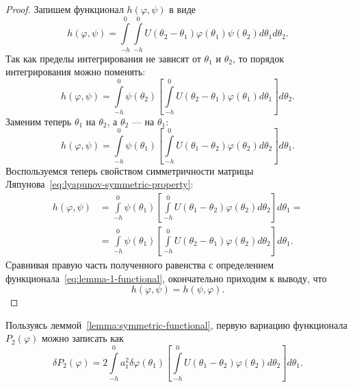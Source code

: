 \documentclass[a4paper,14pt]{article}
\theoremstyle{definition}
\begin{document}
\begin{proof}
  Запишем функционал $h(\varphi, \psi)$ в виде
  \begin{equation*}
    h(\varphi, \psi)
    =
    \int\limits_{-h}^{0}
    \int\limits_{-h}^{0} U(\theta_2 - \theta_1) \varphi(\theta_1) \psi(\theta_2)
    d\theta_1
    d\theta_2.
  \end{equation*}
  Так как пределы интегрирования не зависят от $\theta_1$ и $\theta_2$, то порядок
  интегрирования можно поменять:
  \begin{equation*}
    h(\varphi, \psi)
    =
    \int\limits_{-h}^{0} \psi(\theta_2)
    \left[
      \int\limits_{-h}^{0} U(\theta_2 - \theta_1) \varphi(\theta_1) d\theta_1
    \right]
    d\theta_2.
  \end{equation*}
  Заменим теперь $\theta_1$ на $\theta_2$, а $\theta_2$ --- на $\theta_1$:
  \begin{equation*}
    h(\varphi, \psi)
    =
    \int\limits_{-h}^{0} \psi(\theta_1)
    \left[
      \int\limits_{-h}^{0} U(\theta_1 - \theta_2) \varphi(\theta_2) d\theta_2
    \right]
    d\theta_1.
  \end{equation*}
  Воспользуемся теперь свойством симметричности матрицы
  Ляпунова~\eqref{eq:lyapunov-symmetric-property}:
  \begin{equation*}
    \begin{aligned}
      h(\varphi, \psi)
      &=
        \int\limits_{-h}^{0} \psi(\theta_1)
        \left[
        \int\limits_{-h}^{0} U(\theta_1 - \theta_2) \varphi(\theta_2) d\theta_2
        \right]
        d\theta_1 = \\
      &=
        \int\limits_{-h}^{0} \psi(\theta_1)
        \left[
        \int\limits_{-h}^{0} U(\theta_2 - \theta_1) \varphi(\theta_2) d\theta_2
        \right]
        d\theta_1.
    \end{aligned}
  \end{equation*}
  Сравнивая правую часть полученного равенства с определением
  функционала~\eqref{eq:lemma-1-functional}, окончательно приходим
  к выводу, что
  \begin{equation*}
    h(\varphi, \psi) = h(\psi, \varphi).
  \end{equation*}
\end{proof}
Пользуясь леммой~\ref{lemma:symmetric-functional}, первую вариацию функционала $P_2(\varphi)$
можно записать как
\begin{equation*}
  \delta P_2(\varphi)
  =
  2
  \int\limits_{-h}^{0} a_1^2 \delta \varphi(\theta_1)
  \left[
    \int\limits_{-h}^{0}
    U(\theta_1 - \theta_2) \varphi(\theta_2)
    d\theta_2
  \right]
  d\theta_1.
\end{equation*}
\end{document}

